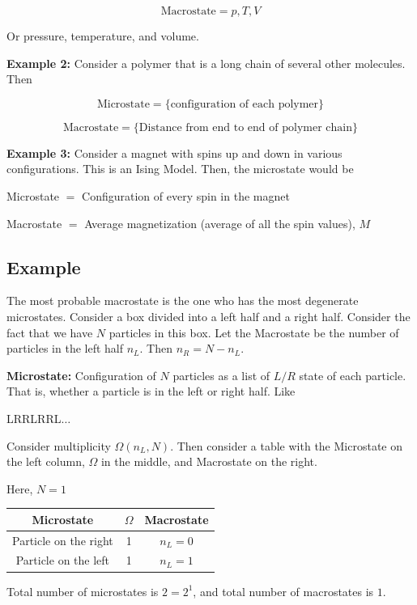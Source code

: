 \documentclass{article}
\newtheorem{one minute paper}[theorem]{One Minute Paper}
\begin{document}
\begin{equation}
    \text{Macrostate} = p, T, V
\end{equation}

Or pressure, temperature, and volume. 


\textbf{Example 2:} Consider a polymer that is a long chain of several other molecules. Then 

\begin{equation}
    \text{Microstate} = \{\text{configuration of each polymer}\}
\end{equation}

\begin{equation}
    \text{Macrostate} = \{\text{Distance from end to end of polymer chain}\}
\end{equation}

\textbf{Example 3:} Consider a magnet with spins up and down in various configurations. This is an Ising Model. Then, the microstate would be 

\begin{center}
    Microstate $=$ Configuration of every spin in the magnet
\end{center}

\begin{center}
    Macrostate $=$ Average magnetization (average of all the spin values), $M$
\end{center}

\subsection*{Example}

The most probable macrostate is the one who has the most degenerate microstates. Consider a box divided into a left half and a right half. 
Consider the fact that we have $N$ particles in this box. Let the Macrostate be the number of particles in the left half $n_L$. Then $n_R = N - n_L$. 

\textbf{Microstate:} Configuration of $N$ particles as a list of $L/R$ state of each particle. That is, whether a particle is in the left or right half. Like 

\begin{center}
    LRRLRRL$\dots$
\end{center}

Consider multiplicity $\Omega(n_L, N)$. Then consider a table with the Microstate on the left column, $\Omega$ in the middle, and Macrostate on the right. 

Here, $N=1$
\begin{center}
\begin{tabular}{|c c c|} 
 \hline
 Microstate & $\Omega$ & Macrostate \\ [0.5ex] 
 \hline\hline
 Particle on the right & 1 & $n_L = 0$ \\ 
 \hline
Particle on the left & 1 & $n_L = 1$ \\
\hline
\end{tabular}
\end{center}
Total number of microstates is $2 = 2^1$, and total number of macrostates is $1$. 
\end{document}

